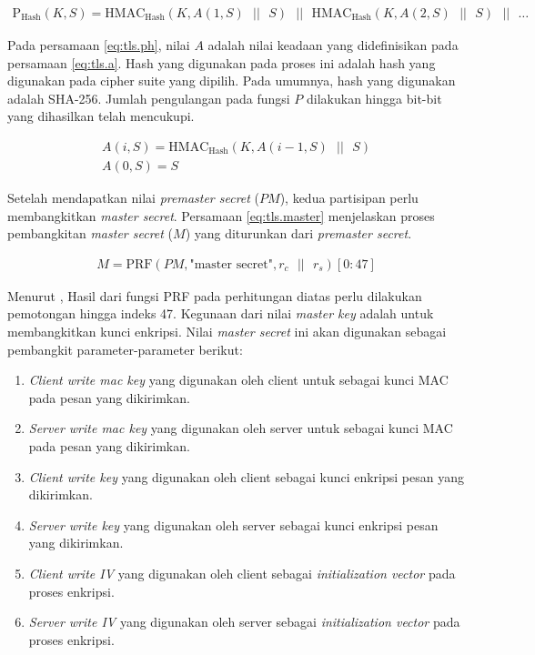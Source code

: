\begin{equation}
  \label{eq:tls.ph}
  \begin{array}{l}   
    \text{P}_\text{Hash}(K, S) = \text{HMAC}_\text{Hash}(K, A(1, S)\text{ }||\text{ }S)\text{ }||\text{ }
        \text{HMAC}_\text{Hash}(K, A(2, S)\text{ }||\text{ }S)\text{ }||\text{ }\ldots
  \end{array}
\end{equation}

Pada persamaan \ref{eq:tls.ph}, nilai $A$ adalah nilai keadaan yang didefinisikan pada persamaan \ref{eq:tls.a}. Hash yang digunakan pada proses ini adalah hash yang digunakan pada cipher suite yang dipilih. Pada umumnya, hash yang digunakan adalah SHA-256. Jumlah pengulangan pada fungsi $P$ dilakukan hingga bit-bit yang dihasilkan telah mencukupi.

\begin{equation}
  \label{eq:tls.a}
  \begin{array}{l}   
    A(i, S) = \text{HMAC}_\text{Hash}(K, A(i-1, S)\text{ }||\text{ }S) \\
    A(0, S) = S
  \end{array}
\end{equation}

Setelah mendapatkan nilai \emph{premaster secret} ($PM$), kedua partisipan perlu membangkitkan \emph{master secret}. Persamaan \ref{eq:tls.master} menjelaskan proses pembangkitan \emph{master secret} ($M$) yang diturunkan dari \emph{premaster secret}.

\begin{equation}
  \label{eq:tls.master}
  \begin{array}{l}
    M = \text{PRF}(PM, \text{"master secret"}, r_c \text{ }||\text{ }r_s)[0:47]
  \end{array}
\end{equation}

Menurut \textcite{rfc5246}, Hasil dari fungsi PRF pada perhitungan diatas perlu dilakukan pemotongan hingga indeks 47. Kegunaan dari nilai \emph{master key} adalah untuk membangkitkan kunci enkripsi. Nilai \emph{master secret} ini akan digunakan sebagai pembangkit parameter-parameter berikut:

\begin{enumerate}
  \item \emph{Client write mac key} yang digunakan oleh client untuk sebagai kunci MAC pada pesan yang dikirimkan.
  \item \emph{Server write mac key} yang digunakan oleh server untuk sebagai kunci MAC pada pesan yang dikirimkan.
  \item \emph{Client write key} yang digunakan oleh client sebagai kunci enkripsi pesan yang dikirimkan.
  \item \emph{Server write key} yang digunakan oleh server sebagai kunci enkripsi pesan yang dikirimkan.
  \item \emph{Client write IV} yang digunakan oleh client sebagai \emph{initialization vector} pada proses enkripsi.
  \item \emph{Server write IV} yang digunakan oleh server sebagai \emph{initialization vector} pada proses enkripsi.
\end{enumerate}

